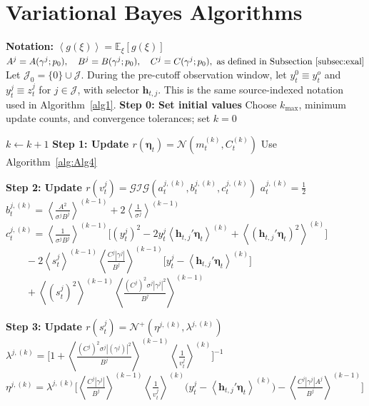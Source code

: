 \documentclass[APA,STIX1COL]{WileyNJD-v2}
\begin{document}
 \clearpage


\section{Variational Bayes Algorithms}

\begin{algorithm}
\caption{Variational Bayes (VB) Algorithm}
\label{alg:Alg3}
\begin{algorithmic}

\State \textbf{Notation:}
\State  $\left\langle g(\xi) \right\rangle = \mathbb{E}_\xi\left[ g(\xi) \right]$
\State  \(
A^j = A(\gamma^j;p_0), \quad B^j = B(\gamma^j;p_0), \quad C^j = C(\gamma^j;p_0), \text{ as defined in Subsection~\ref{subsec:exal}}
\)
\State  Let \(\mathcal{J}_0=\{0\}\cup\mathcal{J}\). During the pre-cutoff observation window, let \(y_t^0 \equiv y_t^o\) and \(y_t^j \equiv z_t^j\) for \(j\in\mathcal{J}\), with selector \(\mathbf{h}_{t,j}\). This is the same source-indexed notation used in Algorithm~\ref{alg1}.
\State \textbf{Step 0: Set initial values}
\State Choose \(k_{\max}\), minimum update counts, and convergence tolerances; set \(k=0\)

    \State \(k \leftarrow k+1\)
    \State \textbf{Step 1: Update $r(\boldsymbol{\eta}_t)=\mathcal{N}(m^{(k)}_t,C^{(k)}_t)$}
    \State Use Algorithm~\ref{alg:Alg4}

        \State \textbf{Step 2: Update $r(v^j_t)=\mathcal{GIG}(a_t^{j,(k)},b_t^{j,(k)},c_t^{j,(k)})$}
            \State $a_t^{j,(k)} = \frac{1}{2}$
            \State $b_t^{j,(k)} = \left\langle \frac{A^2}{\sigma^j B^j} \right\rangle^{(k-1)} + 2 \left\langle \frac{1}{\sigma^j} \right\rangle^{(k-1)}$
            \State $c_t^{j,(k)} = \left\langle \frac{1}{\sigma^j B^j} \right\rangle^{(k-1)} \Big[ (y_t^j)^2 - 2y_t^j \left\langle  \mathbf{h}_{t,j}' \boldsymbol{\eta}_t \right\rangle^{(k)} + \left\langle (  \mathbf{h}_{t,j}' \boldsymbol{\eta}_t )^2 \right\rangle^{(k)} \Big]$
            \State $\quad \quad -2 \left\langle s^j_t \right\rangle^{(k-1)} \left\langle \frac{C^j|\gamma^j|}{B^j} \right\rangle^{(k-1)} \Big[ y_t^j - \left\langle  \mathbf{h}_{t,j}' \boldsymbol{\eta}_t \right\rangle^{(k)} \Big]$
            \State $\quad \quad + \left\langle (s^j_t)^2 \right\rangle^{(k-1)} \left\langle \frac{(C^j)^2\sigma^j|\gamma^j|^2}{B^j} \right\rangle^{(k-1)}$
        \EndFor

        \State \textbf{Step 3: Update $r(s^j_t)=\mathcal{N}^+(\eta^{j,(k)},\lambda^{j,(k)})$}
            \State $\lambda^{j,(k)} = \Big[ 1+\left\langle \frac{(C^j)^2 \sigma^j |(\gamma^j)|^2}{B^j} \right\rangle^{(k-1)} \left\langle \frac{1}{v^j_t} \right\rangle^{(k)} \Big]^{-1}$
            \State $\eta^{j,(k)} = \lambda^{j,(k)}  \Big[ \left\langle \frac{C^j |\gamma^j|}{B^j} \right\rangle^{(k-1)} \left\langle \frac{1}{v^j_t} \right\rangle^{(k)} \Big( y_t^j - \left\langle  \mathbf{h}_{t,j}' \boldsymbol{\eta}_t \right\rangle^{(k)} \Big) - \left\langle \frac{C^j |\gamma^j| A^j}{B^j} \right\rangle^{(k-1)} \Big]$
        \EndFor


\end{algorithmic}
\end{algorithm}
\end{document}
